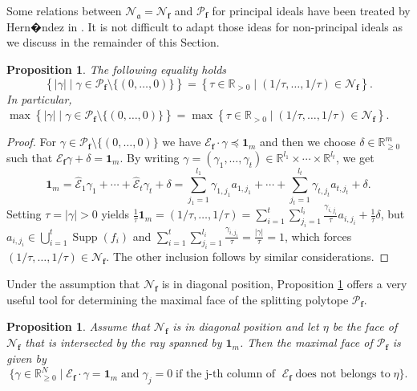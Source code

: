 \documentclass[12pt]{amsart}
\newtheorem{proposition}[theorem]{Proposition}
\theoremstyle{definition}
\numberwithin{equation}{subsection}
\newcommand{\RR}{\mathbb{R}}
\newcommand{\fa}{\mathfrak{a}}
\newcommand{\SP}{\mathcal{P}}
\newcommand{\N}{\mathcal{N}}
\newcommand{\Bf}{\boldsymbol{f}}
\newcommand{\E}{\mathcal{E}}
\newcommand{\tE}{\operatorname{\widehat{\E}}}
\newcommand{\Supp}{\operatorname{Supp}}
\renewcommand{\!}[1]{{\color{red}\text{\Huge$\star$ }#1}}
\begin{document}
Some relations between $\N_{\fa}=\N_{\Bf}$ and $\SP_{\Bf}$ for principal ideals have been treated by Hern�ndez in \cite[Section 4.4]{HDpolynomials}. It is not difficult to adapt those ideas for non-principal ideals as we discuss in the remainder of this Section.
\begin{proposition}\label{Prop:SplPolvsNewPol}
	The following equality holds
	$$\left\lbrace |\gamma|  \mid \gamma\in \SP_{\Bf} \setminus \{(0,\ldots,0)\} \right\rbrace=\left\{\tau \in \RR_{> 0}\mid (1/\tau,\ldots,1/\tau)\in \N_{\Bf} \right\}.$$ 
	In particular, $\max\left\lbrace |\gamma|  \mid \gamma\in \SP_{\Bf} \setminus \{(0,\ldots,0)\} \right\rbrace=\max\left\{\tau \in \RR_{> 0}\mid (1/\tau,\ldots,1/\tau)\in \N_{\Bf} \right\}.$
\end{proposition}
\begin{proof}
	For $\gamma \in \SP_{\Bf} \setminus \{(0,\ldots,0)\}$ we have $\E_{\Bf}\cdot \gamma  \preceq \textbf{1}_{m}$ and then we choose $\delta \in \RR_{\geq 0}^m$ such that $\E_{\Bf} \gamma + \delta = \textbf{1}_{m}$. By writing $\gamma=(\gamma_1,\ldots, \gamma_t) \in \RR^{l_1}\times\cdots\times\RR^{l_t}$, we get  
	\begin{equation*}
		\textbf{1}_{m}=\tE_1 \gamma_1 + \cdots + \tE_t \gamma_t + \delta=\sum_{j_1=1}^{l_1}\gamma_{1,j_1}a_{1,j_1}+ \cdots + \sum_{j_t=1}^{l_t}\gamma_{t,j_t}a_{t,j_t} + \delta.
	\end{equation*}
	Setting $\tau =|\gamma| >0$ yields  $\frac{1}{\tau} \textbf{1}_{m}=(1/\tau,\ldots,1/\tau)=\sum_{i=1}^{t}\sum_{j_i=1}^{l_i}\frac{\gamma_{i,j_i}}{\tau} a_{i,j_i}+\frac{1}{\tau}\delta$, but $a_{i,j_i} \in \bigcup_{i=1}^{t}\Supp(f_i)$ and $\sum_{i=1}^{t}\sum_{j_i=1}^{l_i}\frac{\gamma_{i,j_i}}{\tau}=\frac{|\gamma|}{\tau}=1$, which forces $(1/\tau,\ldots,1/\tau) \in \N_{\Bf}$. The other inclusion follows by similar considerations.
\end{proof}
Under the assumption that $\N_{\Bf}$  is in diagonal position, Proposition \ref{Prop:SplPolvsNewPol} offers a very useful tool for determining the maximal face of  the splitting polytope $\SP_{\Bf}$.
\begin{proposition}\label{Prop:maximal face}
Assume that $\N_{\Bf}$ is in diagonal position and let $\eta$ be the face of $\N_{\Bf}$ that is intersected by the ray spanned by $\textbf{1}_{m}$.  Then the maximal face of $\SP_{\Bf}$ is given by $$\{\gamma \in \RR_{\geq 0}^{N} \mid \E_{\Bf}\cdot \gamma = \textbf{1}_{m} \;\text{and}\; \gamma_{j}=0 \; \text{if the j-th column of } \; \E_{\Bf} \; \text{does not belongs to} \; \eta\}.$$ 
\end{proposition}
\end{document}
